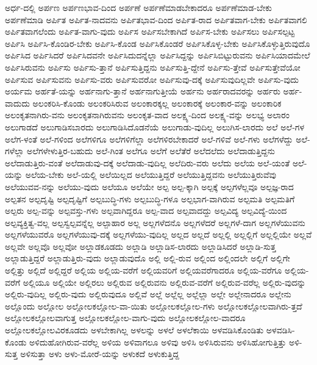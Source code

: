 {ಅರ್ಧ-ದಲ್ಲಿ
ಅರ್ಪಣ
ಅರ್ಪಣಭಾವ-ದಿಂದ
ಅರ್ಪಣೆ
ಅರ್ಪಣೆಮಾಡಬೇಕಾದರೂ
ಅರ್ಪಣೆಮಾಡ-ಬೇಕು
ಅರ್ಪಣೆಮಾಡಿ
ಅರ್ಪಿತ
ಅರ್ಪಿತ-ನಾದವನು
ಅರ್ಪಿತಭಾವ-ದಿಂದ
ಅರ್ಪಿತ-ರಾದ
ಅರ್ಪಿತವಾಗ-ಬೇಕು
ಅರ್ಪಿತವಾಗಲಿ
ಅರ್ಪಿತವಾಗಲೆಂದು
ಅರ್ಪಿತ-ವಾಗು-ವುದು
ಅರ್ಪಿಸ
ಅರ್ಪಿಸಬೇಕಾಗಿದೆ
ಅರ್ಪಿಸ-ಬೇಕು
ಅರ್ಪಿಸಲು
ಅರ್ಪಿಸಲ್ಪಟ್ಟ
ಅರ್ಪಿಸಿ
ಅರ್ಪಿಸಿ-ಕೊಂಡಿರ-ಬೇಕು
ಅರ್ಪಿಸಿ-ಕೊಂಡ
ಅರ್ಪಿಸಿಕೊಂಡರೆ
ಅರ್ಪಿಸಿಕೊಳ್ಳ-ಬೇಕು
ಅರ್ಪಿಸಿಕೊಳ್ಳುತ್ತಿರುವುದೊ
ಅರ್ಪಿಸಿದ
ಅರ್ಪಿಸಿದರೆ
ಅರ್ಪಿಸಿದವನೇ
ಅರ್ಪಿಸಿದುದನ್ನೆಲ್ಲಾ
ಅರ್ಪಿಸಿದ್ದನ್ನು
ಅರ್ಪಿಸಿಬಿಟ್ಟುರುವನು
ಅರ್ಪಿಸಿಯಾದಮೇಲೆ
ಅರ್ಪಿಸಿರುವನು
ಅರ್ಪಿಸು
ಅರ್ಪಿಸು-ತ್ತಾನೆ
ಅರ್ಪಿಸುತ್ತಿದ್ದನು
ಅರ್ಪಿಸುತ್ತಿ-ದ್ದೇನೆ
ಅರ್ಪಿಸು-ತ್ತೇವೆ
ಅರ್ಪಿಸುತ್ತೇವೆಯೋ
ಅರ್ಪಿಸುವ
ಅರ್ಪಿಸುವನು
ಅರ್ಪಿಸು-ವರು
ಅರ್ಪಿಸುವರೋ
ಅರ್ಪಿಸುವು-ದಕ್ಕೆ
ಅರ್ಪಿಸುವುದಿಲ್ಲವೇ
ಅರ್ಪಿಸು-ವುದು
ಅರ್ಯಮ
ಅರ್ಹತೆ-ಯನ್ನು
ಅರ್ಹನಾಗು-ತ್ತಾನೆ
ಅರ್ಹನಾಗುತ್ತೀಯೆ
ಅರ್ಹನು
ಅರ್ಹರಾದವರನ್ನು
ಅರ್ಹರು
ಅರ್ಹ-ವಾದುದು
ಅಲಂಕರಿಸಿ-ಕೊಂಡು
ಅಲಂಕರಿಸಿರುವ
ಅಲಂಕಾರಕ್ಕಲ್ಲ
ಅಲಂಕಾರಕ್ಕೆ
ಅಲಂಕಾರ-ವನ್ನು
ಅಲಂಕಾರಿಕ
ಅಲಂಕೃತನಾಗಿರು-ವನು
ಅಲಂಕೃತನಾಗಿರುವನು
ಅಲಂಕೃತ-ವಾದ
ಅಲಕ್ಷ್ಯ-ದಿಂದ
ಅಲಕ್ಷ್ಯ-ವನ್ನು
ಅಲಭ್ಯ
ಅಲಾರಂ
ಅಲುಗಾಡದೆ
ಅಲುಗಾಡಿಸಬಾರದು
ಅಲುಗಾಡಿಸಿದೊಡನೆಯೆ
ಅಲುಗಾಡು-ವುದಿಲ್ಲ
ಅಲುಗಿಸ-ಲಾರದು
ಅಲೆ
ಅಲೆ-ಗಳ
ಅಲೆಗ-ಳಂತೆ
ಅಲೆ-ಗಳಿಂದ
ಅಲೆಗಳಿಗೂ
ಅಲೆಗಳಿಗೆಲ್ಲಾ
ಅಲೆಗಳಿರಬೇಕಾದರೆ
ಅಲೆ-ಗಳಿವೆ
ಅಲೆ-ಗಳು
ಅಲೆಗಳೆದ್ದು
ಅಲೆ-ಗಳೆಲ್ಲಾ
ಅಲೆಗಳೇಳುತ್ತಿರ-ಬಹುದು
ಅಲೆ-ಗಿಂತ
ಅಲೆಗೂ
ಅಲೆಗೆ
ಅಲೆತೆರೆ
ಅಲೆದಲೆದು
ಅಲೆದಾಡುತ್ತಿದ್ದನು
ಅಲೆದಾಡುತ್ತಿರು-ವಂತೆ
ಅಲೆದಾಡುವು-ದಕ್ಕೆ
ಅಲೆದಾಡು-ವುದಿಲ್ಲ
ಅಲೆದಿರು-ವರು
ಅಲೆದು
ಅಲೆಯ
ಅಲೆ-ಯಂತೆ
ಅಲೆ-ಯನ್ನು
ಅಲೆಯ-ಬೇಕು
ಅಲೆ-ಯಲ್ಲಿ
ಅಲೆಯಿಲ್ಲದ
ಅಲೆಯುತ್ತಿದ್ದರೆ
ಅಲೆಯುತ್ತಿದ್ದವನು
ಅಲೆಯುತ್ತಿರುವೆವು
ಅಲೆಯುವವ-ನನ್ನು
ಅಲೆಯು-ವುದು
ಅಲೆಯೂ
ಅಲೆಯೇ
ಅಲ್ಪ
ಅಲ್ಪ-ಕ್ಕಾಗಿ
ಅಲ್ಪಕ್ಕೆ
ಅಲ್ಪಗಳೆಲ್ಲವೂ
ಅಲ್ಪಜ್ಞ-ರಾದ
ಅಲ್ಪತನ
ಅಲ್ಪದೃಷ್ಟಿ
ಅಲ್ಪದೃಷ್ಟಿಗೆ
ಅಲ್ಪಬುದ್ಧಿ-ಗಳು
ಅಲ್ಪಬುದ್ಧಿ-ಗಳೂ
ಅಲ್ಪಭಾಗ-ವಾಗಿರುವ
ಅಲ್ಪಮತಿ
ಅಲ್ಪಮತಿಗೆ
ಅಲ್ಪರು
ಅಲ್ಪ-ವನ್ನು
ಅಲ್ಪವಸ್ತು-ಗಳು
ಅಲ್ಪವಾಗಿದ್ದರೂ
ಅಲ್ಪ-ವಾದ
ಅಲ್ಪವಾದದ್ದು
ಅಲ್ಪವಿದ್ಯ
ಅಲ್ಪವಿದ್ಯೆ-ಯಿಂದ
ಅಲ್ಪವ್ಯಕ್ತಿತ್ವ-ವಲ್ಲ
ಅಲ್ಪಸ್ವಲ್ಪವನ್ನೆಲ್ಲ
ಅಲ್ಪಾಹಾರ
ಅಲ್ಲ
ಅಲ್ಲಗಳೆದನೊ
ಅಲ್ಲಗಳೆದರೆ
ಅಲ್ಲಗಳೆ-ದಾಗ
ಅಲ್ಲಗಳೆಯುವನು
ಅಲ್ಲಗಳೆಯುವರೊ
ಅಲ್ಲಗಳೆಯುವು-ದಕ್ಕೆ
ಅಲ್ಲಗಳೆಯು-ವುದಿಲ್ಲ
ಅಲ್ಲದ
ಅಲ್ಲದೆ
ಅಲ್ಲಲ್ಲಿ
ಅಲ್ಲಲ್ಲಿಗೆ
ಅಲ್ಲಲ್ಲಿಯೇ
ಅಲ್ಲವೆ
ಅಲ್ಲವೇ
ಅಲ್ಲವೊ
ಅಲ್ಲವೋ
ಅಲ್ಲಾಡಕೂಡದು
ಅಲ್ಲಾಡಿ
ಅಲ್ಲಾಡಿಸ-ಲಾರದು
ಅಲ್ಲಾಡಿಸಿದರೆ
ಅಲ್ಲಾಡಿ-ಸುತ್ತ
ಅಲ್ಲಾಡುತ್ತಿದ್ದರೆ
ಅಲ್ಲಾಡುತ್ತಿರು-ವುದು
ಅಲ್ಲಾಡುವುದೊ
ಅಲ್ಲಿ
ಅಲ್ಲಿ-ರುವ
ಅಲ್ಲಿಂದ
ಅಲ್ಲಿಂದಲೇ
ಅಲ್ಲಿಗೆ
ಅಲ್ಲಿಗೇ
ಅಲ್ಲಿತ್ತು
ಅಲ್ಲಿದೆ
ಅಲ್ಲಿದ್ದರೆ
ಅಲ್ಲಿಯ
ಅಲ್ಲಿಯ-ವರೆಗೆ
ಅಲ್ಲಿಯವರಿಗೆ
ಅಲ್ಲಿಯವರೆಗಾದರೂ
ಅಲ್ಲಿಯ-ವರೆಗೂ
ಅಲ್ಲಿಯ-ವರೆಗೆ
ಅಲ್ಲಿಯೂ
ಅಲ್ಲಿಯೇ
ಅಲ್ಲಿರಲು
ಅಲ್ಲಿರುವ
ಅಲ್ಲಿರುವನು
ಅಲ್ಲಿರುವ-ವರೆಗೆ
ಅಲ್ಲಿರುವ-ವರೆಲ್ಲ
ಅಲ್ಲಿರು-ವುದನ್ನು
ಅಲ್ಲಿರು-ವುದಿಲ್ಲ
ಅಲ್ಲಿರು-ವುದು
ಅಲ್ಲಿರುವುದೂ
ಅಲ್ಲಿವೆ
ಅಲ್ಲೆ
ಅಲ್ಲೆಲ್ಲ
ಅಲ್ಲೆಲ್ಲಾ
ಅಲ್ಲೇ
ಅಲ್ಲೇನಾದರೂ
ಅಲ್ಲೇನು
ಅಲ್ಲೊಂದು
ಅಲ್ಲೋಲ
ಅಲ್ಲೋಲಕಲ್ಲೋಲ-ವಾ-ಯಿತು
ಅಲ್ಲೋಲಕಲ್ಲೋಲ-ಗಳು
ಅಲ್ಲೋಲಕಲ್ಲೋಲವಾಗಿರು-ತ್ತದೆ
ಅಲ್ಲೋಲಕಲ್ಲೋಲವಾಗುತ್ತ
ಅಲ್ಲೋಲಕಲ್ಲೋಲ-ವಾಗು-ವುದು
ಅಲ್ಲೋಲಕಲ್ಲೋಲ-ವಾದರೂ
ಅಲ್ಲೋಲಕಲ್ಲೋಲವಿರಕೂಡದು
ಅಳಬೇಕಾಗಿಲ್ಲ
ಅಳಲನ್ನು
ಅಳಲೆ
ಅಳಲೆಕಾಯಿ
ಅಳವಡಿಸಿಕೊಂಡಿತು
ಅಳವಡಿಸಿ-ಕೊಂಡು
ಅಳಿದುಹೋಗಿರುವ-ವರೆಲ್ಲ
ಅಳಿಯ
ಅಳಿವಾಗಲೂ
ಅಳಿವು
ಅಳಿಸಿ
ಅಳಿಸಿರುವನು
ಅಳಿಸಿಹೋಗುತ್ತಿತ್ತು
ಅಳಿ-ಸುತ್ತ
ಅಳಿಸುತ್ತಾ
ಅಳು
ಅಳು-ಮೋರೆ-ಯನ್ನು
ಅಳುಕದೆ
ಅಳುಕುತ್ತಿದ್ದ
}
